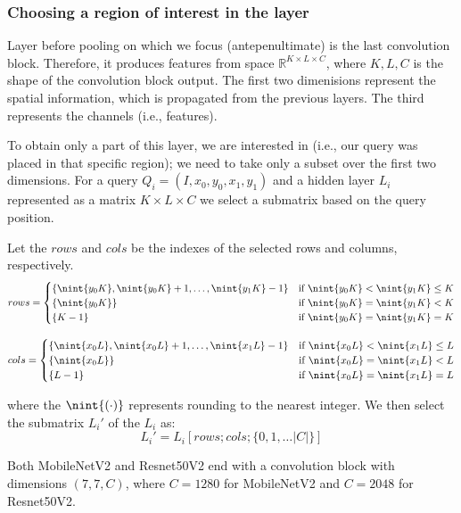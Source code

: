 \subsubsection{Choosing a region of interest in the layer}

Layer before pooling on which we focus (antepenultimate) is the last convolution block. Therefore, it produces features from space $\mathbb{R}^{K\times L \times C}$, where $K, L, C$ is the shape of the convolution block output. The first two dimenisions represent the spatial information, which is propagated from the previous layers. The third represents the channels (i.e., features).


To obtain only a part of this layer, we are interested in (i.e., our query was placed in that specific region); we need to take only a subset over the first two dimensions. For a query $Q_i = (I, x_0, y_0, x_1, y_1)$ and a hidden layer $L_i$ represented as a matrix $K \times L \times C$ we select a submatrix based on the query position. 

Let the $rows$ and $cols$ be the indexes of the selected rows and columns, respectively. 
$$
    rows =
    \begin{cases}
        \{\nint{y_0 K}, \nint{y_0 K} + 1, \ldots, \nint{y_1 K}-1\} & \text{if } \nint{y_0K} < \nint{y_1K} \leq K \\
        \{\nint{y_0K}\} & \text{if } \nint{y_0K} = \nint{y_1K} < K\\
        \{K-1\} & \text{if } \nint{y_0K} = \nint{y_1K} = K\\
    \end{cases}
$$

$$
    cols =
    \begin{cases}
        \{\nint{x_0 L}, \nint{x_0 L} + 1, \ldots, \nint{x_1 L}-1\} & \text{if } \nint{x_0L} < \nint{x_1L} \leq L \\
        \{\nint{x_0L}\} & \text{if } \nint{x_0L} = \nint{x_1L} < L\\
        \{L-1\} & \text{if } \nint{x_0L} = \nint{x_1L} = L\\
    \end{cases}
$$

where the $\nint{(\cdot)}$ represents rounding to the nearest integer. We then select the submatrix $L_i'$ of the $L_i$ as: 
$$
L_i' = L_i[rows; cols; \{0, 1, \ldots |C|\}]
$$

Both MobileNetV2 and Resnet50V2 end with a convolution block with dimensions $(7,7,C)$, where $C = 1280$ for MobileNetV2 and $C = 2048$ for Resnet50V2. 

